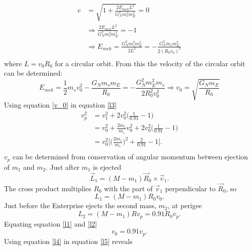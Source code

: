 \begin{example}
\begin{enumerate}
		\begin{equation}
			\begin{split}
				e&=\sqrt{1+\frac{2E_{mek}L^2}{G_N^2m_s^3m_E^2}}=0\\
				&\Rightarrow \frac{2E_{mek}L^2}{G_N^2m_s^3m_E^2}=-1\\
				&\Rightarrow E_{mek}=\frac{G_N^2m_s^3m_E^2}{2L^2}=-\frac{G_N^2m_sm_E^2}{2(R_0v_0)^2}\\
			\end{split}
		\end{equation} 
		\normalsize
		where $L=v_0R_0$ for a circular orbit. From this the velocity of the circular orbit can be determined:
		\begin{equation}
			E_{mek}=\frac{1}{2}m_sv_0^2-\frac{G_Nm_sm_E}{R_0}=-\frac{G_N^2m_E^2m_s}{2R_0^2v_0^2}\Rightarrow v_0=\sqrt{\frac{G_Nm_E}{R_0}}
			\label{v_0}
		\end{equation} 
		Using equation \eqref{v_0} in equation \eqref{l3}
		\begin{equation}
			\begin{split}
				v_p^2&=v_1^2+2v_0^2\bigg(\frac{1}{0.91}-1\bigg)\\
				&=v_0^2+\frac{2m_1}{m_s}v_0^2+2v_0^2\bigg(\frac{1}{0.91}-1\bigg)\\
				&=v_0^2\bigg[\bigg(\frac{2m_1}{m_s}\bigg)^2+\frac{2}{0.91}-1\bigg].\\
			\end{split}
			\label{l5}
		\end{equation} 
		$v_p$ can be determined from conservation of angular momentum between ejection of $m_1$ and $m_2$. Just after $m_1$ is ejected
		\begin{equation}
			\vec{L}_1=(M-m_1)\vec{R}_0\times \vec{v}_1.
		\end{equation} 
		The cross product multiplies $R_0$ with the part of $\vec{v}_1$ perpendicular to $\vec{R}_0$, so
		\begin{equation}
			L_1=(M-m_1)R_0v_0.
			\label{l1}
		\end{equation} 
		Just before the Enterprise ejects the second mass, $m_2$, at perigee
		\begin{equation}
			L_2=(M-m_1)Rv_p=0.91R_0v_p.
			\label{l2}
		\end{equation} 
		Equating equation \eqref{l1} and \eqref{l2}
		\begin{equation}
			v_0=0.91v_p.
			\label{l4}
		\end{equation} 
		Using equation \eqref{l4} in equation \eqref{l5} reveals
		\begin{equation}

\end{equation}
\end{enumerate}
\end{example}
